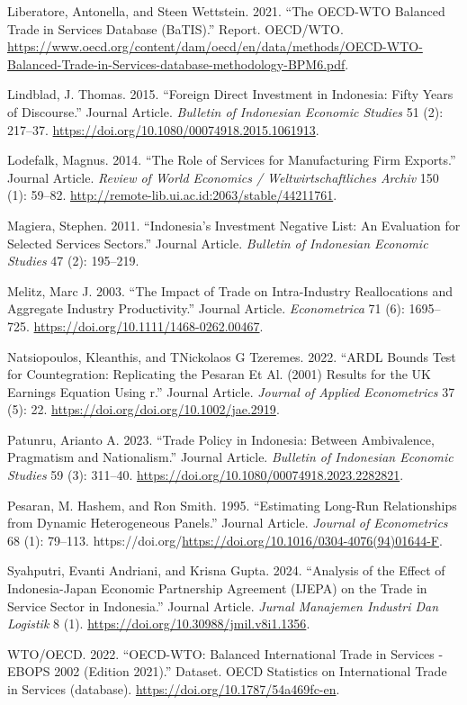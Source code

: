 \documentclass[
  letterpaper,
  DIV=11,
  numbers=noendperiod]{scrartcl}
\newlength{\cslhangindent}
\newenvironment{CSLReferences}[2] %
 {\begin{list}{}{%
  \setlength{\itemindent}{0pt}
  \setlength{\leftmargin}{0pt}
  \setlength{\parsep}{0pt}
  \ifodd #1
   \setlength{\leftmargin}{\cslhangindent}
   \setlength{\itemindent}{-1\cslhangindent}
  \fi
  \setlength{\itemsep}{#2\baselineskip}}}
 {\end{list}}
\begin{document}
\begin{CSLReferences}{1}{0}
Liberatore, Antonella, and Steen Wettstein. 2021. {``The OECD-WTO
Balanced Trade in Services Database (BaTIS).''} Report. OECD/WTO.
\url{https://www.oecd.org/content/dam/oecd/en/data/methods/OECD-WTO-Balanced-Trade-in-Services-database-methodology-BPM6.pdf}.

Lindblad, J. Thomas. 2015. {``Foreign Direct Investment in Indonesia:
Fifty Years of Discourse.''} Journal Article. \emph{Bulletin of
Indonesian Economic Studies} 51 (2): 217--37.
\url{https://doi.org/10.1080/00074918.2015.1061913}.

Lodefalk, Magnus. 2014. {``The Role of Services for Manufacturing Firm
Exports.''} Journal Article. \emph{Review of World Economics /
Weltwirtschaftliches Archiv} 150 (1): 59--82.
\url{http://remote-lib.ui.ac.id:2063/stable/44211761}.

Magiera, Stephen. 2011. {``Indonesia's Investment Negative List: An
Evaluation for Selected Services Sectors.''} Journal Article.
\emph{Bulletin of Indonesian Economic Studies} 47 (2): 195--219.

Melitz, Marc J. 2003. {``The Impact of Trade on Intra-Industry
Reallocations and Aggregate Industry Productivity.''} Journal Article.
\emph{Econometrica} 71 (6): 1695--725.
\url{https://doi.org/10.1111/1468-0262.00467}.

Natsiopoulos, Kleanthis, and TNickolaos G Tzeremes. 2022. {``ARDL Bounds
Test for Countegration: Replicating the Pesaran Et Al. (2001) Results
for the UK Earnings Equation Using r.''} Journal Article. \emph{Journal
of Applied Econometrics} 37 (5): 22.
\url{https://doi.org/doi.org/10.1002/jae.2919}.

Patunru, Arianto A. 2023. {``Trade Policy in Indonesia: Between
Ambivalence, Pragmatism and Nationalism.''} Journal Article.
\emph{Bulletin of Indonesian Economic Studies} 59 (3): 311--40.
\url{https://doi.org/10.1080/00074918.2023.2282821}.

Pesaran, M. Hashem, and Ron Smith. 1995. {``Estimating Long-Run
Relationships from Dynamic Heterogeneous Panels.''} Journal Article.
\emph{Journal of Econometrics} 68 (1): 79--113.
https://doi.org/\url{https://doi.org/10.1016/0304-4076(94)01644-F}.

Syahputri, Evanti Andriani, and Krisna Gupta. 2024. {``Analysis of the
Effect of Indonesia-Japan Economic Partnership Agreement (IJEPA) on the
Trade in Service Sector in Indonesia.''} Journal Article. \emph{Jurnal
Manajemen Industri Dan Logistik} 8 (1).
\url{https://doi.org/10.30988/jmil.v8i1.1356}.

WTO/OECD. 2022. {``OECD-WTO: Balanced International Trade in Services -
EBOPS 2002 (Edition 2021).''} Dataset. OECD Statistics on International
Trade in Services (database). \url{https://doi.org/10.1787/54a469fc-en}.

\end{CSLReferences}
\end{document}
